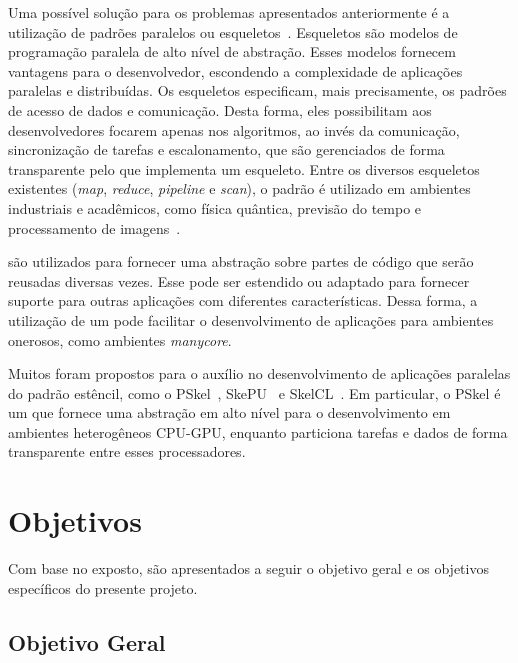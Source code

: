 Uma possível solução para os problemas apresentados anteriormente é a utilização de padrões
paralelos ou esqueletos~\cite{cole-skeleton:2004}. Esqueletos
são modelos de programação paralela de alto nível de abstração. Esses modelos fornecem
vantagens para o desenvolvedor, escondendo a complexidade de aplicações
paralelas e distribuídas. Os esqueletos especificam, mais precisamente,
os padrões de acesso de dados e comunicação. Desta forma, eles possibilitam aos
desenvolvedores focarem apenas nos algoritmos, ao invés da comunicação,
sincronização de tarefas e escalonamento, que são gerenciados de forma
transparente pelo \fw que implementa um esqueleto.
Entre os diversos esqueletos existentes (\textit{map}, \textit{reduce},
\textit{pipeline} e \textit{scan}), o padrão \stencil é
utilizado em ambientes industriais e acadêmicos, como física quântica, previsão do tempo e
processamento de imagens~\cite{gonzalez06,holewinski12}.


\Fws são utilizados para fornecer uma abstração sobre partes de código que serão
reusadas diversas vezes. Esse \fw pode ser estendido ou adaptado para fornecer
suporte para outras aplicações com diferentes características. Dessa forma, a
utilização de um \fw pode facilitar o desenvolvimento de aplicações para
ambientes onerosos, como ambientes \textit{manycore}.

Muitos \fws foram propostos para o auxílio no desenvolvimento de aplicações paralelas do
padrão estêncil, como o
PSkel~\cite{pereira15}, SkePU~\cite{enmyren10} e SkelCL~\cite{steuwer11}. Em
particular, o PSkel é um \fw que fornece uma abstração em alto nível para o
desenvolvimento em ambientes heterogêneos CPU-GPU, enquanto particiona tarefas e
dados de forma transparente entre esses processadores.

\section{Objetivos}

Com base no exposto, são apresentados a seguir o objetivo geral e os objetivos específicos
do presente projeto.

\subsection{Objetivo Geral}

